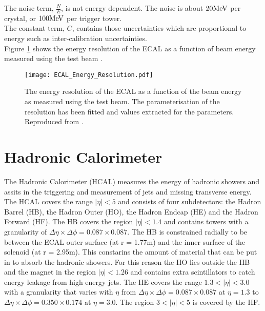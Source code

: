 The noise term, $\frac{N}{E}$, is not energy dependent. The noise is about $20
\mbox{MeV}$ per crystal, or $100\mbox{MeV}$ per trigger tower. \\

The constant term, $C$, contains those uncertainties which are proportional to
energy such as inter-calibration uncertainties. \\

Figure \ref{fig:ECAL_Energy_Resolution} shows the energy resolution of the ECAL
as a function of beam energy measured using the test beam \cite{test_beam}.

\begin{figure}
\begin{center}
\texttt{[image: ECAL\_Energy\_Resolution.pdf]}
\end{center}
\caption{The energy resolution of the ECAL as a function of the beam energy as
measured using the test beam. The parameterisation of the resolution has been 
fitted and values extracted for the parameters. Reproduced from
\cite{test_beam}.}
\label{fig:ECAL_Energy_Resolution}
\end{figure}

\section{Hadronic Calorimeter}

The Hadronic Calorimeter (HCAL) measures the energy of hadronic showers and
assits in the triggering and measurement of jets and missing transverse energy.
\\

The HCAL covers the range $|\eta| < 5$ and consists of four subdetectors: the
Hadron Barrel (HB), the Hadron Outer (HO), the Hadron Endcap (HE) and the Hadron
Forward (HF). The HB covers the region $|\eta| < 1.4$ and contains towers with a 
granularity of $\Delta\eta\times\Delta\phi = 0.087\times0.087$. The HB is 
constrained radially to be between the ECAL outer surface (at r = 1.77m) and the
inner surface of the solenoid (at r = 2.95m). This constarins the amount of 
material that can be put in to absorb the hadronic showers. For this reason the 
HO lies outside the HB and the magnet in the region $|\eta| < 1.26$ and contains
extra scintillators to catch energy leakage from high energy jets. The HE covers
the range $1.3 < |\eta| < 3.0$ with a granularity that varies with $\eta$ from 
$\Delta\eta\times\Delta\phi = 0.087\times0.087$ at $\eta = 1.3$ to 
$\Delta\eta\times\Delta\phi = 0.350\times0.174$ at $\eta = 3.0$. The region $3 <
 |\eta| < 5$ is covered by the HF. \\

